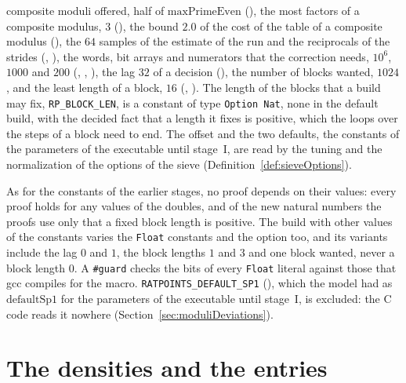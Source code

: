 \begin{definition}
  composite moduli offered, half of $\mathrm{maxPrimeEven}$ (), the
  most factors of a composite modulus, $3$ (), the bound $2.0$ of
  the cost of the table of a composite modulus (), the $64$
  samples of the estimate of the run and the reciprocals of the strides
  (, ), the words, bit arrays
  and numerators that the correction needs, $10^6$, $1000$ and $200$
  (, ,
  ), the lag $32$ of a decision
  (), the number of blocks wanted, $1024$, and the least length
  of a block, $16$ (, ). The
  length of the blocks that a build may fix, \verb|RP_BLOCK_LEN|, is a constant of type
  \verb|Option Nat|, none in the default build, with the decided fact that a length it fixes is
  positive, which the loops over the steps of a block need to end. The offset and the two defaults,
  the constants of the parameters of the executable until stage~I, are read by the tuning and the
  normalization of the options of the sieve (Definition~\ref{def:sieveOptions}).
\end{definition}

As for the constants of the earlier stages, no proof depends on their values: every proof holds for
any values of the doubles, and of the new natural numbers the proofs use only that a fixed block
length is positive. The build with other values of the constants varies the \verb|Float| constants
and the option too, and its variants include the lag $0$ and $1$, the block lengths $1$ and $3$ and
one block wanted, never a block length $0$. A \verb|#guard| checks the bits of every \verb|Float|
literal against those that gcc compiles for the macro. \verb|RATPOINTS_DEFAULT_SP1|
(), which the model had as $\mathrm{defaultSp1}$ for the parameters of
the executable until stage~I, is excluded: the C code reads it nowhere
(Section~\ref{sec:moduliDeviations}).

\section{The densities and the entries}\label{sec:densities}

